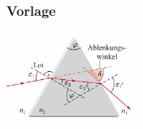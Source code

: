 \subsubsection{Vorlage}

\begin{center}
	\begin{minipage}{0.25\textwidth}
		
	\end{minipage}%
	\begin{minipage}{0.25\textwidth}
		\includegraphics[height=3cm,keepaspectratio=true]{Images/prisma.png}
	\end{minipage}
\end{center}
